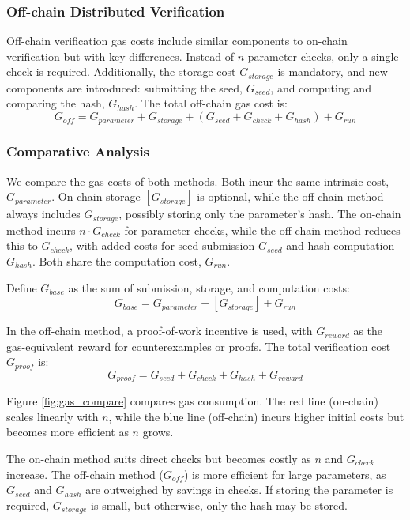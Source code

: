 \documentclass[runningheads]{llncs}
\begin{document}
\subsubsection{Off-chain Distributed Verification}
Off-chain verification gas costs include similar components to on-chain verification but with key differences. Instead of \( n \) parameter checks, only a single check is required. Additionally, the storage cost \( G_{storage} \) is mandatory, and new components are introduced: submitting the seed, \( G_{seed} \), and computing and comparing the hash, \( G_{hash} \). The total off-chain gas cost is:
\begin{equation*}
\label{gas-off}
G_{off} = G_{parameter} + G_{storage} + (G_{seed} + G_{check} + G_{hash}) + G_{run}
\end{equation*}
\subsubsection{Comparative Analysis}
We compare the gas costs of both methods. Both incur the same intrinsic cost, \( G_{parameter} \). On-chain storage \( [G_{storage}] \) is optional, while the off-chain method always includes \( G_{storage} \), possibly storing only the parameter's hash. The on-chain method incurs \( n \cdot G_{check} \) for parameter checks, while the off-chain method reduces this to \( G_{check} \), with added costs for seed submission \( G_{seed} \) and hash computation \( G_{hash} \). Both share the computation cost, \( G_{run} \).

Define \( G_{base} \) as the sum of submission, storage, and computation costs:
\[
G_{base} = G_{parameter} + [G_{storage}] + G_{run}
\]

In the off-chain method, a proof-of-work incentive is used, with \( G_{reward} \) as the gas-equivalent reward for counterexamples or proofs. The total verification cost \( G_{proof} \) is:
\[
G_{proof} = G_{seed} + G_{check} + G_{hash} + G_{reward}
\]

Figure \ref{fig:gas_compare} compares gas consumption. The red line (on-chain) scales linearly with \( n \), while the blue line (off-chain) incurs higher initial costs but becomes more efficient as \( n \) grows.

The on-chain method suits direct checks but becomes costly as \( n \) and \( G_{check} \) increase. The off-chain method (\( G_{off} \)) is more efficient for large parameters, as \( G_{seed} \) and \( G_{hash} \) are outweighed by savings in checks. If storing the parameter is required, \( G_{storage} \) is small, but otherwise, only the hash may be stored.
\end{document}
